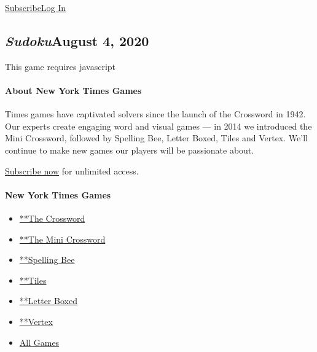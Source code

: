 \href{https://www.nytimes.com/subscription/games?campaignId=4QHQ8}{Subscribe}\href{https://myaccount.nytimes.com/auth/login?redirect_uri=https\%3A\%2F\%2Fwww.nytimes.com\%2Fpuzzles\%2Fsudoku\&response_type=cookie\&client_id=games\&application=crosswords\&asset=navigation-bar}{Log
In}

\hypertarget{sudokuaugust-4-2020}{%
\subsection{\texorpdfstring{\emph{Sudoku}August 4,
2020}{SudokuAugust 4, 2020}}\label{sudokuaugust-4-2020}}

This game requires javascript

\hypertarget{about-new-york-times-games}{%
\paragraph{About New York Times
Games}\label{about-new-york-times-games}}

Times games have captivated solvers since the launch of the Crossword in
1942. Our experts create engaging word and visual games --- in 2014 we
introduced the Mini Crossword, followed by Spelling Bee, Letter Boxed,
Tiles and Vertex. We'll continue to make new games our players will be
passionate about.

\href{https://www.nytimes.com/subscription/games?campaignId=9W9LL}{Subscribe
now} for unlimited access.

\hypertarget{new-york-times-games-1}{%
\paragraph{New York Times Games}\label{new-york-times-games-1}}

\begin{itemize}
\tightlist
\item
  \href{/crosswords/game/daily}{**The Crossword}
\item
  \href{/crosswords/game/mini}{**The Mini Crossword}
\item
  \href{/puzzles/spelling-bee}{**Spelling Bee}
\item
  \href{/puzzles/tiles}{**Tiles}
\item
  \href{/puzzles/letter-boxed}{**Letter Boxed}
\item
  \href{/puzzles/vertex}{**Vertex}
\item
  \href{/crosswords}{All Games}
\end{itemize}

